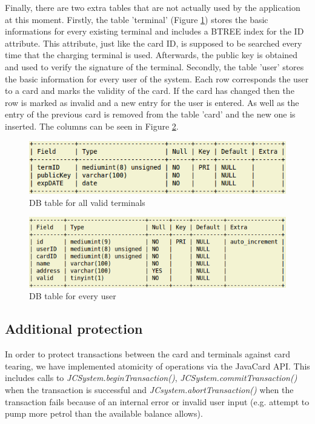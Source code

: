 \documentclass[a4paper,10pt]{llncs}
\begin{document}
Finally, there are two extra tables that are not actually used by the application at this moment. Firstly, the table 'terminal' (Figure \ref{figure:dbtable_terminal}) stores the basic informations for every existing terminal and includes a BTREE index for the ID attribute. This attribute, just like the card ID, is supposed to be searched every time that the charging terminal is used. Afterwards, the public key is obtained and used to verify the signature of the terminal. Secondly, the table 'user' stores the basic information for every user of the system. Each row corresponds the user to a card and marks the validity of the card. If the card has changed then the row is marked as invalid and a new entry for the user is entered. As well as the entry of the previous card is removed from the table 'card' and the new one is inserted. The columns can be seen in Figure \ref{figure:dbtable_user}.
    \begin{figure}
    	\centering
    	\includegraphics[scale=0.38]{img/dbtable_terminal.png}
    	\caption{\label{figure:dbtable_terminal}DB table for all valid terminals}
    \end{figure}    
    \begin{figure}
    	\centering
    	\includegraphics[scale=0.38]{img/dbtable_user.png}
    	\caption{\label{figure:dbtable_user}DB table for every user}
    \end{figure}
\subsection{Additional protection}

In order to protect transactions between the card and terminals against card tearing, we have implemented atomicity of operations via the JavaCard API. This includes calls to \emph{JCSystem.beginTransaction()}, \emph{JCSystem.commitTransaction()} when the transaction is successful and \emph{JCsystem.abortTransaction()} when the transaction fails because of an internal error or invalid user input (e.g. attempt to pump more petrol than the available balance allows).
\end{document}
